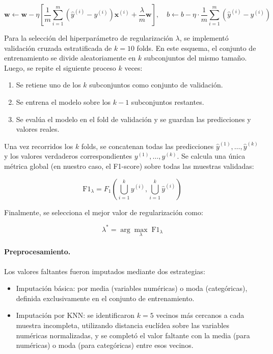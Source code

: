 \documentclass[11pt]{article}
\begin{document}
\[
\mathbf{w} \leftarrow \mathbf{w} - \eta \left[ \frac{1}{m} \sum_{i=1}^{m} (\hat{y}^{(i)} - y^{(i)}) \mathbf{x}^{(i)} + \frac{\lambda}{m} \mathbf{w} \right], \quad
b \leftarrow b - \eta \cdot \frac{1}{m} \sum_{i=1}^{m} (\hat{y}^{(i)} - y^{(i)})
\]

Para la selección del hiperparámetro de regularización $\lambda$, se implementó validación cruzada estratificada de $k=10$ folds. En este esquema, el conjunto de entrenamiento se divide aleatoriamente en $k$ subconjuntos del mismo tamaño. Luego, se repite el siguiente proceso $k$ veces:

\begin{enumerate}
    \item Se retiene uno de los $k$ subconjuntos como conjunto de validación.
    \item Se entrena el modelo sobre los $k-1$ subconjuntos restantes.
    \item Se evalúa el modelo en el fold de validación y se guardan las predicciones y valores reales.
\end{enumerate}

Una vez recorridos los $k$ folds, se concatenan todas las predicciones $\hat{y}^{(1)}, \ldots, \hat{y}^{(k)}$ y los valores verdaderos correspondientes $y^{(1)}, \ldots, y^{(k)}$. Se calcula una única métrica global (en nuestro caso, el F1-score) sobre todas las muestras validadas:

\[
\text{F1}_\lambda = F_1\left( \bigcup_{i=1}^k y^{(i)}, \bigcup_{i=1}^k \hat{y}^{(i)} \right)
\]

Finalmente, se selecciona el mejor valor de regularización como:

\[
\lambda^* = \arg\max_\lambda \; \text{F1}_\lambda
\]

\paragraph{Preprocesamiento.}

Los valores faltantes fueron imputados mediante dos estrategias:
\begin{itemize}
    \item Imputación básica: por media (variables numéricas) o moda (categóricas), definida exclusivamente en el conjunto de entrenamiento.
    \item Imputación por KNN: se identificaron $k=5$ vecinos más cercanos a cada muestra incompleta, utilizando distancia euclídea sobre las variables numéricas normalizadas, y se completó el valor faltante con la media (para numéricas) o moda (para categóricas) entre esos vecinos.
\end{itemize}
\end{document}
